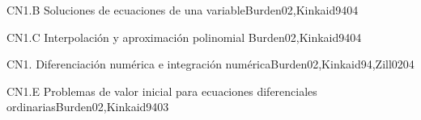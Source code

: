 \begin{syllabus}
\begin{unit}{CN1.B Soluciones de ecuaciones de una variable}{}{Burden02,Kinkaid94}{0}{4}
\begin{topics}
      \item \CNONETopicIterative
   \end{topics}
   \begin{learningoutcomes}
      \item \CNONEObjONE
      \item \CNONEObjTWO
      \item \CNONEObjTHREE
      \item \CNONEObjFOUR
   \end{learningoutcomes}
\end{unit}

\begin{unit}{CN1.C Interpolación y aproximación polinomial }{}{Burden02,Kinkaid94}{0}{4}
\begin{topics}
      \item \CNONETopicCurve
   \end{topics}

   \begin{learningoutcomes}
      \item \CNONEObjONE
      \item \CNONEObjTWO
      \item \CNONEObjTHREE
      \item \CNONEObjFOUR
   \end{learningoutcomes}
\end{unit}

\begin{unit}{CN1. Diferenciación numérica e integración numérica}{}{Burden02,Kinkaid94,Zill02}{0}{4}
\begin{topics}
      \item \CNONETopicNumerical
      \item \CNONETopicExplicit
   \end{topics}

   \begin{learningoutcomes}
      \item \CNONEObjONE
      \item \CNONEObjTWO
      \item \CNONEObjTHREE
      \item \CNONEObjFOUR
   \end{learningoutcomes}
\end{unit}

\begin{unit}{CN1.E Problemas de valor inicial para ecuaciones diferenciales ordinarias}{}{Burden02,Kinkaid94}{0}{3}
\begin{topics}
      \item \CNONETopicDifferential
   \end{topics}


\end{unit}
\end{syllabus}
